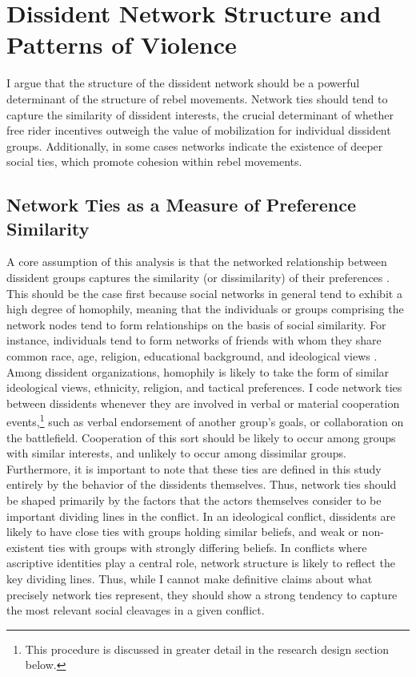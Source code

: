
\section{Dissident Network Structure and Patterns of Violence}

I argue that the structure of the dissident network should be a powerful determinant of the structure of rebel movements. Network ties should tend to capture the similarity of dissident interests, the crucial determinant of whether free rider incentives outweigh the value of mobilization for individual dissident groups. Additionally, in some cases networks indicate the existence of deeper social ties, which promote cohesion within rebel movements.

\subsection{Network Ties as a Measure of Preference Similarity}

A core assumption of this analysis is that the networked relationship between dissident groups captures the similarity (or dissimilarity) of their preferences \citep[a similar assumption is made by][]{Metternich2013}. This should be the case first because social networks in general tend to exhibit a high degree of homophily, meaning that the individuals or groups comprising the network nodes tend to form relationships on the basis of social similarity. For instance, individuals tend to form networks of friends with whom they share common race, age, religion, educational background, and ideological views \citep{Mcpherson2001}. Among dissident organizations, homophily is likely to take the form of similar ideological views, ethnicity, religion, and tactical preferences. I code network ties between dissidents whenever they are involved in verbal or material cooperation events,\footnote{This procedure is discussed in greater detail in the research design section below.} such as verbal endorsement of another group's goals, or collaboration on the battlefield. Cooperation of this sort should be likely to occur among groups with similar interests, and unlikely to occur among dissimilar groups. Furthermore, it is important to note that these ties are defined in this study entirely by the behavior of the dissidents themselves. Thus, network ties should be shaped primarily by the factors that the actors themselves consider to be important dividing lines in the conflict. In an ideological conflict, dissidents are likely to have close ties with groups holding similar beliefs, and weak or non-existent ties with groups with strongly differing beliefs. In conflicts where ascriptive identities play a central role, network structure is likely to reflect the key dividing lines. Thus, while I cannot make definitive claims about what precisely network ties represent, they should show a strong tendency to capture the most relevant social cleavages in a given conflict.


